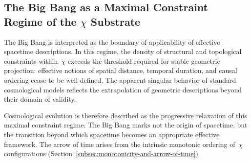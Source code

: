 \subsection{The Big Bang as a Maximal Constraint Regime of the \texorpdfstring{$\chi$}{χ} Substrate}
  \label{subsec:big-bang-maximal-constraint}

  The Big Bang is interpreted as the boundary of applicability of effective spacetime descriptions.
  In this regime, the density of structural and topological constraints
  within~$\chi$ exceeds the threshold required for stable geometric
  projection: effective notions of spatial distance, temporal duration, and
  causal ordering cease to be well-defined.
  The apparent singular behavior of standard cosmological models reflects
  the extrapolation of geometric descriptions beyond their domain of validity.

  Cosmological evolution is therefore described as the progressive
  relaxation of this maximal constraint regime.
  The Big Bang marks not the origin of spacetime, but the transition beyond
  which spacetime becomes an appropriate effective framework.
  The arrow of time arises from the intrinsic monotonic ordering of~$\chi$ configurations
  (Section~\ref{subsec:monotonicity-and-arrow-of-time}).
